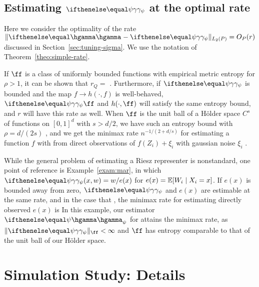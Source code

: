 \subsection{Estimating $\riesz[\psi]$ at the optimal rate}
\label{sec:estimating-riesz-optimal}
Here we consider the optimality of the rate $\norm{\hriesz - \riesz[\psi]}_{L_2(P)} = O_P(r)$ discussed in Section~\ref{sec:tuning-sigma}.
We use the notation of Theorem~\ref{theo:simple-rate}. 

If $\ff$ is a class of uniformly bounded functions with empirical metric entropy 
  for $\rho > 1$, it can be shown that $r_Q = $ 
\citep[see e.g.,][Equation 2.4]{koltchinskii2006local}. Furthermore, if $\riesz[\psi]$ is bounded
and the map $f \to h(\cdot,f)$ is well-behaved, $\riesz[\psi]\ff$ and $h(\cdot,\ff)$ will satisfy the same entropy bound, and
$r$ will have this rate as well. When $\ff$ is the unit ball of a H\"older space $C^s$ of functions on $[0,1]^d$
with $s>d/2$, we have such an entropy bound with $\rho = d/(2s)$ \citep{tikhomirov1993varepsilon, van1994bracketing},
and we get the minimax rate $n^{-1/(2+d/s)}$ for estimating a function $f$ with 
from direct observations of $f(Z_i) + \xi_i$ with gaussian noise $\xi_i$ \citep[Theorem 3.2]{gyorfi2006distribution}.

While the general problem of estimating a Riesz representer is nonstandard, one point of reference is Example~\ref{exam:mar},
in which $\riesz[\psi](x,w)=w/e(x)$ for $e(x)=\E[W_i \mid X_i=x]$. If $e(x)$ is bounded away from zero,
$\riesz[\psi]$ and $e(x)$ are estimable at the same rate, and in the case that ,
the minimax rate for estimating directly observed $e(x)$ is 
In this example, our estimator $\hriesz[\psi]$ for  
attains the minimax rate, as $\norm{\riesz[\psi]}_{\ff} < \infty$ and $\ff$ has entropy comparable to that of the unit ball of our H\"older space.

\section{Simulation Study: Details}
\label{sec:simu_details}

